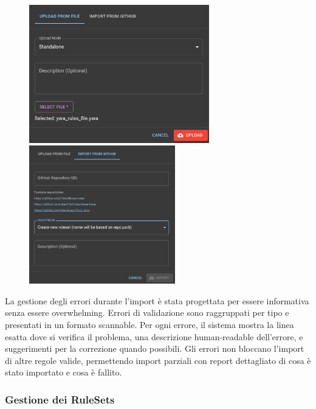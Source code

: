 \begin{figure}[H]
\centering
\begin{minipage}{0.45\textwidth}
\centering
\includegraphics[width=\textwidth,height=6cm]{images/volweb-esteso/volweb-upload-dialog.png}
\end{minipage}
\hspace{0.05\textwidth}
\begin{minipage}{0.45\textwidth}
\centering
\includegraphics[width=\textwidth,height=6cm]{images/volweb-esteso/volweb-import-dialog.png}
\end{minipage}
\end{figure}

La gestione degli errori durante l'import è stata progettata per essere informativa senza essere overwhelming. Errori di validazione sono raggruppati per tipo e presentati in un formato scannable. Per ogni errore, il sistema mostra la linea esatta dove si verifica il problema, una descrizione human-readable dell'errore, e suggerimenti per la correzione quando possibili. Gli errori non bloccano l'import di altre regole valide, permettendo import parziali con report dettagliato di cosa è stato importato e cosa è fallito.

\subsubsection{Gestione dei RuleSets}

